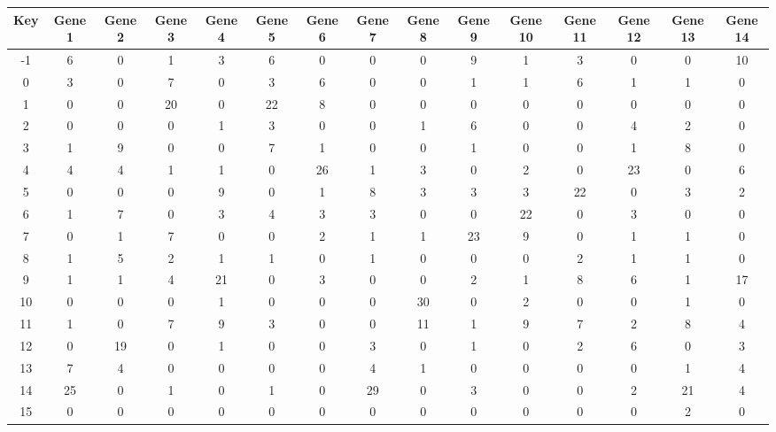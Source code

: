 \begin{tabular}{|c|c|c|c|c|c|c|c|c|c|c|c|c|c|c|}
\hline
Key & Gene 1 & Gene 2 & Gene 3 & Gene 4 & Gene 5 & Gene 6 & Gene 7 & Gene 8 & Gene 9 & Gene 10 & Gene 11 & Gene 12 & Gene 13 & Gene 14 \\
\hline
-1 & 6 & 0 & 1 & 3 & 6 & 0 & 0 & 0 & 9 & 1 & 3 & 0 & 0 & 10 \\
0 & 3 & 0 & 7 & 0 & 3 & 6 & 0 & 0 & 1 & 1 & 6 & 1 & 1 & 0 \\
1 & 0 & 0 & 20 & 0 & 22 & 8 & 0 & 0 & 0 & 0 & 0 & 0 & 0 & 0 \\
2 & 0 & 0 & 0 & 1 & 3 & 0 & 0 & 1 & 6 & 0 & 0 & 4 & 2 & 0 \\
3 & 1 & 9 & 0 & 0 & 7 & 1 & 0 & 0 & 1 & 0 & 0 & 1 & 8 & 0 \\
4 & 4 & 4 & 1 & 1 & 0 & 26 & 1 & 3 & 0 & 2 & 0 & 23 & 0 & 6 \\
5 & 0 & 0 & 0 & 9 & 0 & 1 & 8 & 3 & 3 & 3 & 22 & 0 & 3 & 2 \\
6 & 1 & 7 & 0 & 3 & 4 & 3 & 3 & 0 & 0 & 22 & 0 & 3 & 0 & 0 \\
7 & 0 & 1 & 7 & 0 & 0 & 2 & 1 & 1 & 23 & 9 & 0 & 1 & 1 & 0 \\
8 & 1 & 5 & 2 & 1 & 1 & 0 & 1 & 0 & 0 & 0 & 2 & 1 & 1 & 0 \\
9 & 1 & 1 & 4 & 21 & 0 & 3 & 0 & 0 & 2 & 1 & 8 & 6 & 1 & 17 \\
10 & 0 & 0 & 0 & 1 & 0 & 0 & 0 & 30 & 0 & 2 & 0 & 0 & 1 & 0 \\
11 & 1 & 0 & 7 & 9 & 3 & 0 & 0 & 11 & 1 & 9 & 7 & 2 & 8 & 4 \\
12 & 0 & 19 & 0 & 1 & 0 & 0 & 3 & 0 & 1 & 0 & 2 & 6 & 0 & 3 \\
13 & 7 & 4 & 0 & 0 & 0 & 0 & 4 & 1 & 0 & 0 & 0 & 0 & 1 & 4 \\
14 & 25 & 0 & 1 & 0 & 1 & 0 & 29 & 0 & 3 & 0 & 0 & 2 & 21 & 4 \\
15 & 0 & 0 & 0 & 0 & 0 & 0 & 0 & 0 & 0 & 0 & 0 & 0 & 2 & 0 \\
\hline
\end{tabular}